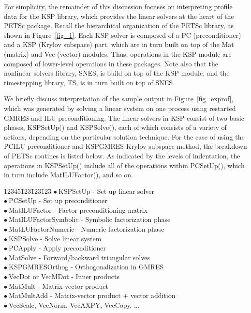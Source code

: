 For simplicity, the remainder of this discussion focuses on
interpreting profile data for the KSP library,
which provides the linear solvers at the heart of the
PETSc package.  Recall the hierarchical organization of the PETSc
library, as shown in Figure~\ref{fig_1}.  Each KSP solver
is composed of a PC (preconditioner) and a KSP (Krylov
subspace) part, which are in turn built on top of the Mat
(matrix) and Vec (vector) modules.  Thus, operations in the
KSP module are composed of lower-level operations in these
packages.  Note also that the nonlinear solvers library, SNES,
is build on top of the KSP module, and the timestepping
library, TS, is in turn built on top of SNES.

We briefly discuss interpretation of the sample output in
Figure~\ref{fig_exprof}, which was generated by solving a linear
system on one process using restarted GMRES and ILU
preconditioning.  The linear solvers in KSP consist of two
basic phases, KSPSetUp() and KSPSolve(), each of which
consists of a variety of actions, depending on the particular
solution technique.
For the case of using the PCILU preconditioner and KSPGMRES
Krylov subspace method, the breakdown of PETSc routines is listed below.
As indicated by the levels of indentation, the
operations in KSPSetUp() include all of the operations within
PCSetUp(), which in turn include MatILUFactor(), and so on.
\newcommand{\bu}{$\bullet \: $}
\begin{tabbing}
12345\=123\=123\=123\= \kill
\> \bu KSPSetUp - Set up linear solver\\
\>\> \bu PCSetUp - Set up preconditioner\\
\>\>\> \bu MatILUFactor - Factor preconditioning matrix\\
\>\>\>\> \bu MatILUFactorSymbolic - Symbolic factorization phase\\
\>\>\>\> \bu MatLUFactorNumeric - Numeric factorization phase\\
\> \bu KSPSolve - Solve linear system\\
\>\> \bu PCApply - Apply preconditioner\\
\>\>\> \bu MatSolve - Forward/backward triangular solves\\
\>\> \bu KSPGMRESOrthog - Orthogonalization in GMRES\\
\>\>\> \bu VecDot or VecMDot - Inner products\\
\>\> \bu MatMult - Matrix-vector product\\
\>\> \bu MatMultAdd - Matrix-vector product + vector addition\\
\>\> \bu  VecScale, VecNorm, VecAXPY, VecCopy, ...\\
\end{tabbing}

